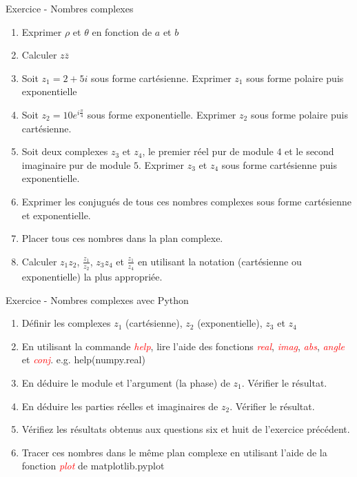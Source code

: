 \documentclass{beamer}
\newcounter{exampleBlockCounter}
\begin{document}
\begin{frame} 
	\begin{exampleblock}{Exercice  -  Nombres complexes}
		\begin{enumerate}\justifying
			  \item Exprimer $\rho$ et $\theta$ en fonction de $a$ et $b$
			  \item Calculer $z \overline{z}$
			  \item Soit $z_1=2+5i$ sous forme cartésienne. Exprimer $z_1$ sous forme
			  polaire puis exponentielle
			  \item Soit $z_2=10e^{i\frac{\pi}{4}}$ sous forme exponentielle. Exprimer
			  $z_2$ sous forme polaire puis cartésienne.
			  \item Soit deux complexes $z_3$ et $z_4$, le premier réel pur de module
			  $4$ et le second imaginaire pur de module $5$. Exprimer $z_3$ et $z_4$
			  sous forme cartésienne puis exponentielle.
			  \item Exprimer les conjugués de tous ces nombres complexes sous forme
			  cartésienne et exponentielle.
			  \item Placer tous ces nombres dans la plan complexe.
			  \item Calculer $z_1z_2$, $\frac{z_1}{z_2}$, $z_3z_4$ et $\frac{z_1}{z_4}$
			  en utilisant la notation (cartésienne ou exponentielle) la plus appropriée.
		\end{enumerate}
	\end{exampleblock}
\end{frame}
\begin{frame}
	\begin{exampleblock}{Exercice  - Nombres complexes avec Python}
		\begin{enumerate}\justifying
			  \item Définir les complexes $z_1$ (cartésienne), $z_2$ (exponentielle),
			  $z_3$ et $z_4$
			  \item En utilisant la commande \textit{\textcolor{red}{help}}, lire l'aide
			  des fonctions \textit{\textcolor{red}{real}},
			  \textit{\textcolor{red}{imag}}, \textit{\textcolor{red}{abs}},
			  \textit{\textcolor{red}{angle}} et \textit{\textcolor{red}{conj}}. e.g. help(numpy.real)
			  \item En déduire le module et l'argument (la phase) de $z_1$. Vérifier le
			  résultat.
			  \item En déduire les parties réelles et imaginaires de $z_2$. Vérifier le
			  résultat.
			  \item Vérifiez les résultats obtenus aux questions six et huit de
			  l'exercice précédent.
			  \item Tracer ces nombres dans le même plan complexe en utilisant l'aide de
			  la fonction \textit{\textcolor{red}{plot}} de matplotlib.pyplot
		\end{enumerate}
	\end{exampleblock}
\end{frame}
\end{document}
